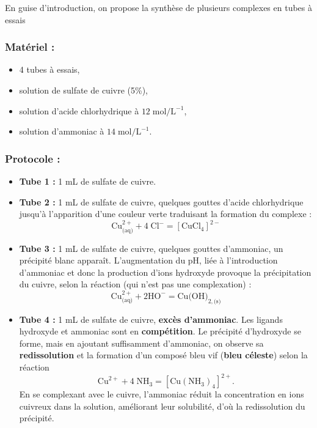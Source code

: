 \documentclass[11pt,a4paper]{report}
\begin{document}
En guise d'introduction, on propose la synthèse de plusieurs complexes en tubes à essais
\subsubsection*{Matériel :}
\begin{itemize}
	\item 4 tubes à essais,
	\item solution de sulfate de cuivre (5\%),
	\item solution d'acide chlorhydrique à $12\;\text{mol}/\text{L}^{-1}$,
	\item solution d'ammoniac à $14\;\text{mol}/\text{L}^{-1}$. 
\end{itemize}

\subsubsection*{Protocole :}
\begin{itemize}
	\item \textbf{Tube 1 :} 1 mL de sulfate de cuivre.\\
	\item \textbf{Tube 2 :} 1 mL de sulfate de cuivre, quelques gouttes d'acide chlorhydrique 				jusqu'à l'apparition d'une couleur verte traduisant la formation du complexe :
	\begin{equation}
		\text{Cu}^{2+}_\text{(aq)} + 4\;\text{Cl}^- = [\text{CuCl}_4]^{2-}
	\end{equation}
	\item \textbf{Tube 3 :} 1 mL de sulfate de cuivre, quelques gouttes d'ammoniac, un précipité 		blanc apparaît. L'augmentation du pH, liée à l'introduction d'ammoniac et donc la production 		d'ions hydroxyde provoque la précipitation du cuivre, selon la réaction (qui n'est pas une 			complexation) :
	\begin{equation}
		\text{Cu}^{2+}_\text{(aq)} + 2\text{HO}^- = \text{Cu(OH)}_{2,\text{(s)}}
	\end{equation}
	\item \textbf{Tube 4 :} 1 mL de sulfate de cuivre, \textbf{excès d'ammoniac}. Les ligands 			hydroxyde et ammoniac sont en \textbf{compétition}. Le précipité d'hydroxyde se forme, mais en 		ajoutant suffisamment d'ammoniac, on observe sa \textbf{redissolution} et la formation d'un 		composé bleu vif (\textbf{bleu céleste}) selon la réaction
	\begin{equation}
		\text{Cu}^{2+} + 4\;\text{NH}_3 = [\text{Cu}{(\text{NH}_3)}_4]^{2+}.
	\end{equation}
	En se complexant avec le cuivre, l'ammoniac réduit la concentration en ions cuivreux dans la 		solution, améliorant leur solubilité, d'où la redissolution du précipité.
\end{itemize}
\end{document}
